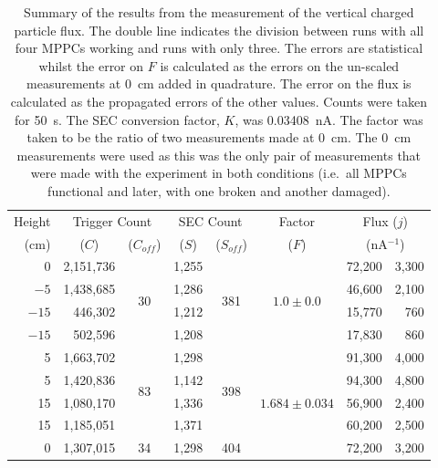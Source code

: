 \begin{table}
  \begin{center}
    \begin{tabular}{ r | r | c | c | c | c | r@{~\(\pm\)~}r } 
      Height   &  \multicolumn{2}{c|}{Trigger Count}    &  \multicolumn{2}{c|}{SEC Count}  &  Factor   &  \multicolumn{2}{c}{Flux (\(j\))}          \\
      (cm)     &  \multicolumn{1}{c|}{(\(C\))}  
                             &  (\(C_{off}\))           &    (\(S\))   &   (\(S_{off}\))   &  (\(F\))  &  \multicolumn{2}{c}{(nA\(^{-1}\))} \\
      \hline
        0      &  2,151,736  &    \multirow{4}{*}{30}   &   1,255  &  \multirow{4}{*}{381} &  \multirow{4}{*}{\(1.0\pm0.0\)}  
                                                                                                      &  72,200 & 3,300  \\
      \(-5 \)  &  1,438,685  &                          &   1,286  &                       &          &  46,600 & 2,100  \\
      \(-15\)  &    446,302  &                          &   1,212  &                       &          &  15,770 &   760  \\
      \(-15\)  &    502,596  &                          &   1,208  &                       &          &  17,830 &   860  \\
      \hline \hline
        5      &  1,663,702  &   \multirow{4}{*}{83}    &   1,298  &  \multirow{4}{*}{398} &  \multirow{5}{*}{\(1.684\pm0.034\)}  
                                                                                                      &  91,300 & 4,000  \\
        5      &  1,420,836  &                          &   1,142  &                       &          &  94,300 & 4,800  \\
       15      &  1,080,170  &                          &   1,336  &                       &          &  56,900 & 2,400  \\
       15      &  1,185,051  &                          &   1,371  &                       &          &  60,200 & 2,500  \\
       \cline{3-3} \cline {5-5} %
        0      &  1,307,015  &         34               &   1,298  &             404       &          &  72,200 & 3,200  \\
    \end{tabular}
  \end{center}
  \caption{Summary of the results from the measurement of the vertical charged particle flux. The double line indicates the division between runs with all four MPPCs working and runs with only three. The errors are statistical whilst the error on \(F\) is calculated as the errors on the un-scaled measurements at 0~cm added in quadrature. The error on the flux is calculated as the propagated errors of the other values. Counts were taken for 50~s. The SEC conversion factor, \(K\), was 0.03408~nA. The factor was taken to be the ratio of two measurements made at 0~cm. The 0~cm measurements were used as this was the only pair of measurements that were made with the experiment in both conditions (i.e.\ all MPPCs functional and later, with one broken and another damaged).}

\end{table}
